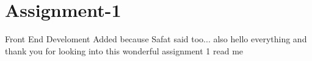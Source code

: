 \chapter{Assignment-\/1 }
\hypertarget{md__r_e_a_d_m_e}{}\label{md__r_e_a_d_m_e}
\label{md__r_e_a_d_m_e_autotoc_md0}%
%


Front End Develoment Added because Safat said too... also hello everything and thank you for looking into this wonderful assignment 1 read me 